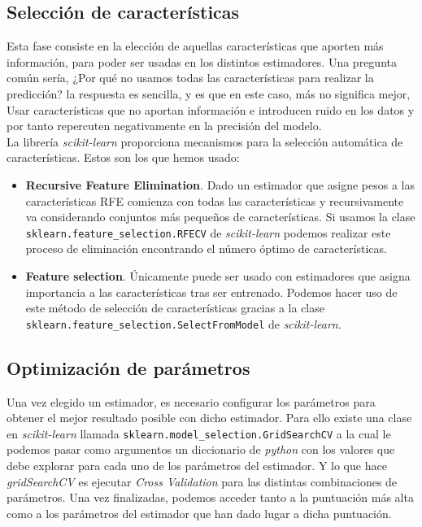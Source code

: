 \subsection{Selección de características}
Esta fase consiste en la elección de aquellas características que aporten más información, para poder ser usadas en los distintos estimadores.
Una pregunta común sería, ¿Por qué no usamos todas las características para realizar la predicción? la respuesta es sencilla, y es que en este caso, más no significa mejor,
Usar características que no aportan información e introducen ruido en los datos y por tanto repercuten negativamente en la precisión del modelo.\\


La librería \textit{scikit-learn} proporciona mecanismos para la selección automática de características.
Estos son los que hemos usado:

\begin{itemize}
\item \textbf{Recursive Feature Elimination}. Dado un estimador que asigne pesos a las características RFE comienza con todas las características y recursivamente va considerando conjuntos más pequeños de características.
Si usamos la clase \texttt{sklearn.feature\_selection.RFECV} de \textit{scikit-learn} podemos realizar este proceso de eliminación encontrando el número óptimo de características.

\item \textbf{Feature selection}. Únicamente puede ser usado con estimadores que asigna importancia a las características tras ser entrenado. Podemos hacer uso de este método de selección de características gracias a la clase \texttt{sklearn.feature\_selection.SelectFromModel} de \textit{scikit-learn}.

\end{itemize}

\subsection{Optimización de parámetros}
Una vez elegido un estimador, es necesario configurar los parámetros para obtener el mejor resultado posible con dicho estimador. Para ello existe una clase en \textit{scikit-learn} llamada \texttt{sklearn.model\_selection.GridSearchCV} a la cual le podemos pasar como argumentos un diccionario de \textit{python} con los valores que debe explorar para cada uno de los parámetros del estimador. Y lo que hace \textit{gridSearchCV} es ejecutar \textit{Cross Validation} para las distintas combinaciones de parámetros.
Una vez finalizadas, podemos acceder tanto a la puntuación más alta como a los parámetros del estimador que han dado lugar a dicha puntuación.


